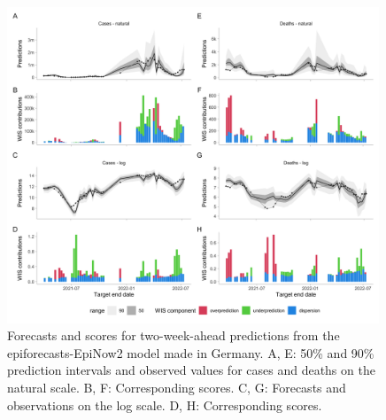 \documentclass{article}
\begin{document}
\begin{figure}[h!]
    \centering
    \includegraphics[width=0.99\textwidth]{output/figures/HUB-model-comparison-epinow.png}
    \caption{
    Forecasts and scores for two-week-ahead predictions from the epiforecasts-EpiNow2 model \citep{epinow2} made in Germany. A, E: 50\% and 90\% prediction intervals and observed values for cases and deaths on the natural scale. B, F: Corresponding scores. C, G: Forecasts and observations on the log scale. D, H: Corresponding scores. 
    }
    \label{fig:HUB-model-comparison-epinow}
\end{figure}




\clearpage

\end{document}
